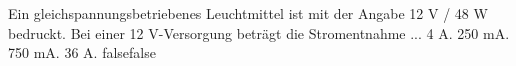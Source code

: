     {Ein gleichspannungsbetriebenes Leuchtmittel ist mit der Angabe 12 V / 48 W bedruckt.  Bei einer 12 V-Versorgung beträgt die Stromentnahme ...}
    {4 A.}
    {250 mA.}
    {750 mA.}
    {36 A.}
    {false}{false}
